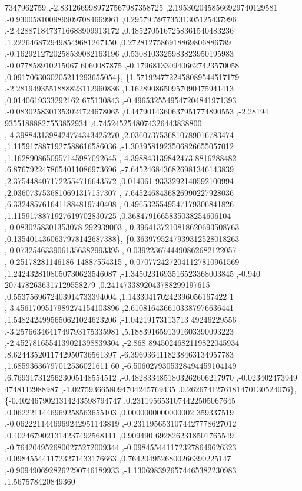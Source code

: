 \begin{DoxyCode}
      7347962759 ,-2.8312669989727567987358725 ,2.1953020458566929740129581 ,-0.9300581009899097084669961 ,0.29579
      59773531305125437996 ,-2.4288718473716683909913172 ,0.4852705167258361540483236 ,1.2226468729498549681267150
       ,0.2728127586918869806886789 ,-0.1629212720258539082163196 ,0.5308103325983823950195983 ,-0.077858910215067
      6060087875 ,-0.1796813309406627423570058 ,0.0917063030205211293655054\},
\{1.5719247722458089544517179 ,-2.2819493551888823112960836 ,1.1628908650957090475941413 ,0.0140619333292162
      675130843 ,-0.4965325549547204841971393 ,-0.0830258301353024724678065 ,0.4479014360637951774890553 ,-2.28194
      93551888827553852934 ,4.7452452548074326443838800 ,-4.3988431398424774343425270 ,2.0360737536810789016783474
       ,1.1159178871927588616586036 ,-1.3039581923506826655057012 ,1.1628908650957145987092645 ,-4.398843139842473
      8816288482 ,6.8767922478654011086973696 ,-7.6452468436826981346143839 ,2.3754484071722554716643572 ,0.014061
      9333292140592100994 ,2.0360737536810691317157307 ,-7.6452468436826990227928036 ,6.3324857616411884819740408 
      ,-0.4965325549547179306841826 ,1.1159178871927619702830725 ,0.3684791665835038254606104 ,-0.0830258301353078
      292939003 ,-0.3964137210818620693508763 ,0.1354014360637978142687388\},
\{0.3639795247939312528018263 ,-0.0732546339061356382993395 ,-0.0392236744490862682122057 ,-0.25178281146186
      14887554315 ,-0.0707724272041127810961569 ,1.2424328108050730623546087 ,-1.3450231693516523368003845 ,-0.940
      2074782636317129558279 ,0.2414733892043788299197615 ,0.5537569672403914733394004 ,1.143304170242396056167422
      1 ,-3.4561709517989274154103896 ,2.6108164366103387976636441 ,1.5482424995650621024623206 ,-1.04219173113713
      49246229556 ,-3.2576634641749793175335981 ,5.1883916591391603390093223 ,-2.4527816554139021398839304 ,-2.868
      8945024682119822045934 ,8.6244352011742950736561397 ,-6.3969364118238463134957783 ,1.68593636797012536021611
      60 ,-6.5060279305328494459104149 ,6.7693173125623005148554512 ,-0.4828334851803262606217970 ,-0.023402473949
      4748112988987 ,-1.0275936658094704245769435 ,0.2626741276181470130524076\},
\{-0.4024679021314243598794747 ,0.2311956531074422505067645 ,0.0622211446969258563655103 ,0.0000000000000002
      359337519 ,-0.0622211446969242951143819 ,-0.2311956531074427778627012 ,0.4024679021314237492568111 ,0.909490
      6928262318501765549 ,-0.7642049526800275272009344 ,-0.0984554411723278649626323 ,0.0984554411723271433176663
       ,0.7642049526800266390225147 ,-0.9094906928262290746189933 ,-1.1306983926574465382230983 ,1.567578420849360

\end{DoxyCode}
